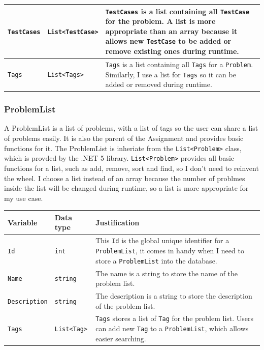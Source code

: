 \documentclass[a4paper]{report}
\begin{document}
\begin{tabulary}{\textwidth}{|l|l|L|}
      \hline
      \texttt{TestCases} & \texttt{List<TestCase>} & \texttt{TestCases} is a list containing all \texttt{TestCase} for the problem. A list is more appropriate than an array because it allows new \texttt{TestCase} to be added or remove existing ones during runtime. \\
      \hline
      \texttt{Tags} & \texttt{List<Tags>} & \texttt{Tags} is a list containing all \texttt{Tags} for a \texttt{Problem}. Similarly, I use a list for \texttt{Tags} so it can be added or removed during runtime. \\
      \hline
\end{tabulary}

\subsubsection{ProblemList}

A ProblemList is a list of problems, with a list of tags so the user can share a list of problems easily. It is also the parent of the Assignment and provides basic functions for it. The ProblemList is inheriate from the \texttt{List<Problem>} class, which is provded by the .NET 5 library. \texttt{List<Problem>} provides all basic functions for a list, such as add, remove, sort and find, so I don't need to reinvent the wheel. I choose a list instead of an array because the number of problmes inside the list will be changed during runtime, so a list is more appropriate for my use case.

\begin{tabulary}{\textwidth}{|l|l|L|}
      \hline
      Variable & Data type & Justification \\
      \hline
      \texttt{Id} & \texttt{int} & This \texttt{Id} is the global unique identifier for a \texttt{ProblemList}, it comes in handy when I need to store a \texttt{ProblemList} into the database. \\
      \hline
      \texttt{Name} & \texttt{string} & The name is a string to store the name of the problem list. \\
      \hline
      \texttt{Description} & \texttt{string} & The description is a string to store the description of the problem list. \\
      \hline
      \texttt{Tags} & \texttt{List<Tag>} & \texttt{Tags} stores a list of \texttt{Tag} for the problem list. Users can add new \texttt{Tag} to a \texttt{ProblemList}, which allows easier searching. \\
      \hline
\end{tabulary}
\end{document}
